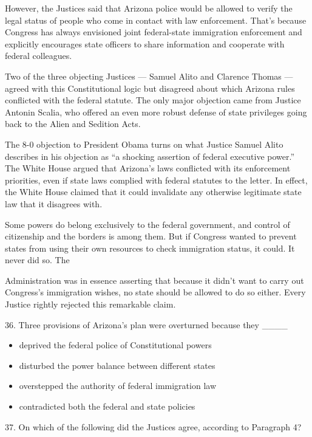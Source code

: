 \documentclass[UTF8,11pt]{ctexart}
\begin{document}
However, the Justices said that Arizona police would be allowed to verify the legal status of people who come in contact with law enforcement. That’s because Congress has always envisioned joint federal-state immigration enforcement and explicitly encourages state officers to share information and cooperate with federal colleagues.


Two of the three objecting Justices — Samuel Alito and Clarence Thomas — agreed with this Constitutional logic but disagreed about which Arizona rules conflicted with the federal statute. The only major objection came from Justice Antonin Scalia, who offered an even more robust defense of state privileges going back to the Alien and Sedition Acts.


The 8-0 objection to President Obama turns on what Justice Samuel Alito describes in his objection as “a shocking assertion of federal executive power.” The White House argued that Arizona’s laws conflicted with its enforcement priorities, even if state laws complied with federal statutes to the letter. In effect, the White House claimed that it could invalidate any otherwise legitimate state law that it disagrees with.


Some powers do belong exclusively to the federal government, and control of citizenship and the borders is among them. But if Congress wanted to prevent states from using their own resources to check immigration status, it could. It never did so. The


Administration was in essence asserting that because it didn’t want to carry out Congress’s immigration wishes, no state should be allowed to do so either. Every Justice rightly rejected this remarkable claim.


36. Three provisions of Arizona’s plan were overturned because they \_\_\_\_


\begin{itemize}[leftmargin=2em,itemsep=.2em,topsep=.4em]\item[A.] deprived the federal police of Constitutional powers
\item[B.] disturbed the power balance between different states
\item[C.] overstepped the authority of federal immigration law
\item[D.] contradicted both the federal and state policies
\end{itemize}

37. On which of the following did the Justices agree, according to Paragraph 4?
\end{document}
